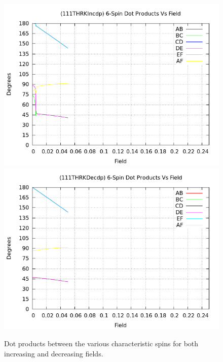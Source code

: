 \documentclass{article}
\begin{document}
\begin{figure}
\centering
\includegraphics[scale=0.55]{HVariedData/Pictures/111THRKIncdp.png}
\includegraphics[scale=0.55]{HVariedData/Pictures/111THRKDecdp.png}
\caption{Dot products between the various characteristic spins for both increasing and decreasing fields.}
\end{figure}
\clearpage
\end{document}
